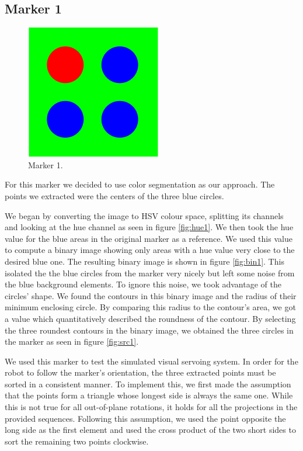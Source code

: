 \documentclass[]{scrartcl}
\begin{document}
\subsection{Marker 1}
\begin{figure}
	\centering
	\includegraphics[width=0.4\linewidth]{fig/marker1.png}
	\caption{Marker 1.}
	\label{fig:mar1}
\end{figure}
For this marker we decided to use color segmentation as our approach. The points we extracted were the centers of the three blue circles.\par
We began by converting the image to HSV colour space, splitting its channels and looking at the hue channel as seen in figure \ref{fig:hue1}. We then took the hue value for the blue areas in the original marker as a reference. We used this value to compute a binary image showing only areas with a hue value very close to the desired blue one. The resulting binary image is shown in figure \ref{fig:bin1}. This isolated the the blue circles from the marker very nicely but left some noise from the blue background elements. To ignore this noise, we took advantage of the circles' shape. We found the contours in this binary image and the radius of their minimum enclosing circle. By comparing this radius to the contour's area, we got a value which quantitatively described the roundness of the contour. By selecting the three roundest contours in the binary image, we obtained the three circles in the marker as seen in figure \ref{fig:src1}.\par
We used this marker to test the simulated visual servoing system. In order for the robot to follow the marker's orientation, the three extracted points must be sorted in a consistent manner. To implement this, we first made the assumption that the points form a triangle whose longest side is always the same one. While this is not true for all out-of-plane rotations, it holds for all the projections in the provided sequences. Following this assumption, we used the point opposite the long side as the first element and used the cross product of the two short sides to sort the remaining two points clockwise.\par
\end{document}
